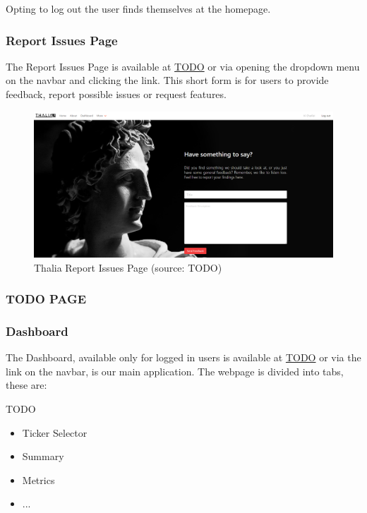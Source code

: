 \documentclass[main.tex]{subfiles}
\begin{document}
Opting to log out the user finds themselves at the homepage.

\subsubsection{Report Issues Page}

The Report Issues Page is available at \url{TODO} or via opening the dropdown menu on the navbar and clicking the link. This short form is for users to provide feedback, 
report possible issues or request features.

\begin{figure}[H]
   \centering
   \includegraphics[width=\textwidth]{08Appendices/081User/081Pictures/issues.png}
   \caption{Thalia Report Issues Page (source: TODO)}
   \label{thalia_issues}
\end{figure}

\subsubsection{TODO PAGE}

\subsubsection{Dashboard}

The Dashboard, available only for logged in users is available at \url{TODO} or via the link on the navbar, is our main application. 
The webpage is divided into tabs, these are:

TODO
\begin{itemize}
    \item Ticker Selector
    \item Summary
    \item Metrics
    \item ...
\end{itemize}
\end{document}
